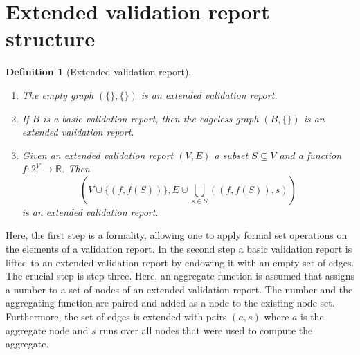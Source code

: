 \documentclass[a4paper, 11pt]{article}
\newtheorem{definition}{Definition}
\begin{document}
\section{Extended validation report structure}
\begin{definition}[Extended validation report]\leavevmode
\begin{enumerate}
\item The empty graph $(\{\},\{\})$ is an extended validation report.
\item If $B$ is a basic validation report, then the edgeless graph $(B, \{\})$
is an extended validation report.
\item Given an extended validation report $(V,E)$  a subset $S\subseteq V$ and
a function $f:2^V\to\mathbb{R}$.  Then 
\begin{displaymath}
\left(
V\cup \{(f,f(S))\}, E\cup \bigcup_{s\in S}\left( (f,f(S)), s \right)
\right)
\end{displaymath}
is an extended validation report.
\end{enumerate}
\end{definition}
Here, the first step is a formality, allowing one to apply formal set
operations on the elements of a validation report. In the second step a basic
validation report is lifted to an extended validation report by endowing it
with an empty set of edges. The crucial step is step three. Here, an aggregate
function is assumed that assigns a number to a set of nodes of an extended
validation report. The number and the aggregating function are paired and added
as a node to the existing node set. Furthermore, the set of edges is extended
with pairs $(a,s)$ where $a$ is the aggregate node and $s$ runs over all nodes
that were used to compute the aggregate.




\end{document}
